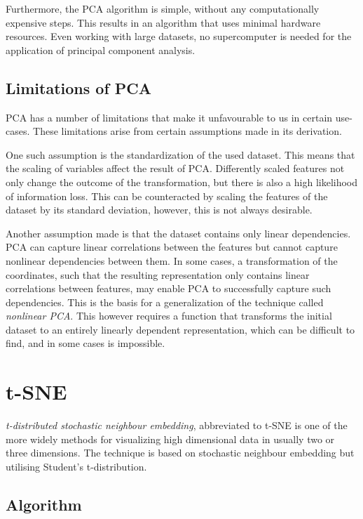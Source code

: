 Furthermore, the PCA algorithm is simple, without any computationally expensive steps. This results in an algorithm that uses minimal hardware resources. Even working with large datasets, no supercomputer is needed for the application of principal component analysis.

\subsection{Limitations of PCA}\label{subsec:limitations-of-pca}


PCA has a number of limitations that make it unfavourable to us in certain use-cases. These limitations arise from certain assumptions made in its derivation.

One such assumption is the standardization of the used dataset. This means that the scaling of variables affect the result of PCA. Differently scaled features not only change the outcome of the transformation, but there is also a high likelihood of information loss. This can be counteracted by scaling the features of the dataset by its standard deviation, however, this is not always desirable.

Another assumption made is that the dataset contains only linear dependencies. PCA can capture linear correlations between the features but cannot capture nonlinear dependencies between them. In some cases, a transformation of the coordinates, such that the resulting representation only contains linear correlations between features, may enable PCA to successfully capture such dependencies. This is the basis for a generalization of the technique called \textit{nonlinear PCA}\cite{bib:nonlinpca}. This however requires a function that transforms the initial dataset to an entirely linearly dependent representation, which can be difficult to find, and in some cases is impossible.

\section{t-SNE}\label{sec:t-sne}

\textit{t-distributed stochastic neighbour embedding}\cite{bib:tsne}, abbreviated to t-SNE is one of the more widely methods for visualizing high dimensional data in usually two or three dimensions. The technique is based on stochastic neighbour embedding\cite{bib:sne} but utilising Student's t-distribution.

\subsection{Algorithm}

